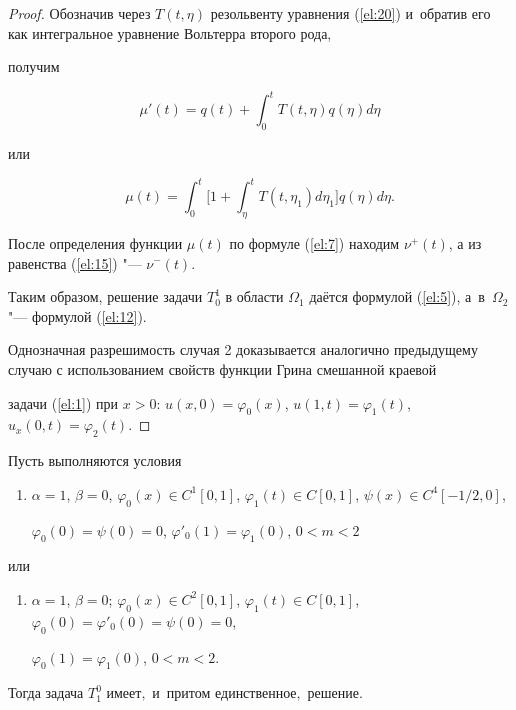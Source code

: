 \begin{proof}
Обозначив через $T(t,\eta)$ резольвенту уравнения (\ref{el:20}) и~обратив его как интегральное уравнение Вольтерра второго рода, 

получим

$$\mu'(t)=q(t)+\int_0^tT(t,\eta)q(\eta)d\eta$$

или

\pagebreak



$$\mu(t)=\int_0^t\biggl[1+\int_{\eta}^tT(t,\eta_1)d\eta_1\biggr]q(\eta)d\eta.$$



После определения функции $\mu(t)$ по формуле (\ref{el:7}) находим $\nu^+(t)$, а из равенства (\ref{el:15}) "---  $\nu^-(t)$.

Таким образом, решение задачи $T_0^1$ в области $\Omega_1$ даётся формулой (\ref{el:5}), а~в~$\Omega_2$ "--- формулой (\ref{el:12}).



Однозначная разрешимость случая 2 доказывается аналогично предыдущему случаю с использованием свойств функции Грина смешанной краевой

задачи (\ref{el:1}) при $x>0$: $u(x, 0)=\varphi_0(x)$, $u(1,t)=\varphi_1(t)$, $u_x(0,t)=\varphi_2(t)$.

\end{proof}



\smallskip



\begin{theorem}[2]Пусть выполняются условия

\begin{enumerate}

\item[\rm 1)] $\alpha=1${\rm,} $\beta=0${\rm,} $\varphi_0(x)\in C^1[0, 1]${\rm,} $\varphi_1(t)\in C[0, 1]${\rm,} $\psi(x)\in C^4[-1/2, 0]${\rm,}

$\varphi_0(0)=\psi(0)=0${\rm,} $\varphi'_0(1)=\varphi_1(0)${\rm,} $0<m<2$ 

\end{enumerate}

или

\begin{enumerate}

\item[\rm 2)] $\alpha=1${\rm,} $\beta=0${\rm;} $\varphi_0(x)\in C^2[0, 1]${\rm,} $\varphi_1(t)\in C[0, 1]${\rm,} $\varphi_0(0)=\varphi'_0(0)=\psi(0)=0${\rm,}

$\varphi_0(1)=\varphi_1(0)${\rm,} $0<m<2$\rm.

\end{enumerate}

Тогда задача $T_1^0$ имеет$,$ и~притом единственное$,$ решение\rm.

\end{theorem}



